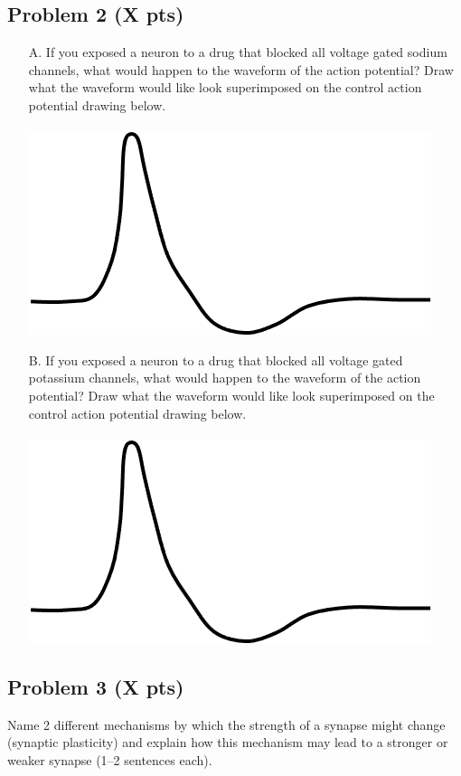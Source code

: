 \documentclass{article}
\begin{document}
\subsection*{Problem 2 (X pts)}
\begin{enumerate}
    \item[A.] If you exposed a neuron to a drug that blocked all voltage gated sodium channels, what would happen to the waveform of the action potential? Draw what the waveform would like look superimposed on the control action potential drawing below.\\\\
    \includegraphics[scale = 1]{action_potential.png}
    \item[B.] If you exposed a neuron to a drug that blocked all voltage gated potassium channels, what would happen to the waveform of the action potential? Draw what the waveform would like look superimposed on the control action potential drawing below.\\\\
    \includegraphics[scale = 1]{action_potential.png}
\end{enumerate}

\subsection*{Problem 3 (X pts)}
Name 2 different mechanisms by which the strength of a synapse might change (synaptic plasticity) and explain how this mechanism may lead to a stronger or weaker synapse (1--2 sentences each).
\end{document}
